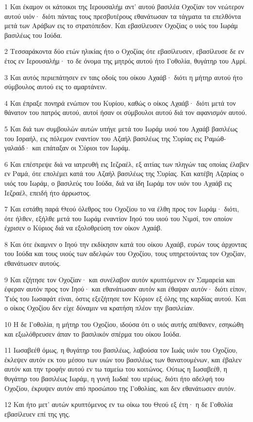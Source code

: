 \par 1 Και έκαμον οι κάτοικοι της Ιερουσαλήμ αντ' αυτού βασιλέα Οχοζίαν τον νεώτερον αυτού υιόν· διότι πάντας τους πρεσβυτέρους εθανάτωσαν τα τάγματα τα επελθόντα μετά των Αράβων εις το στρατόπεδον. Και εβασίλευσεν Οχοζίας ο υιός του Ιωράμ βασιλέως του Ιούδα.
\par 2 Τεσσαράκοντα δύο ετών ηλικίας ήτο ο Οχοζίας ότε εβασίλευσεν, εβασίλευσε δε εν έτος εν Ιερουσαλήμ· το δε όνομα της μητρός αυτού ήτο Γοθολία, θυγάτηρ του Αμρί.
\par 3 Και αυτός περιεπάτησεν εν ταις οδοίς του οίκου Αχαάβ· διότι η μήτηρ αυτού ήτο σύμβουλος αυτού εις το αμαρτάνειν.
\par 4 Και έπραξε πονηρά ενώπιον του Κυρίου, καθώς ο οίκος Αχαάβ· διότι μετά τον θάνατον του πατρός αυτού, αυτοί ήσαν οι σύμβουλοι αυτού διά τον αφανισμόν αυτού.
\par 5 Και διά των συμβουλών αυτών υπήγε μετά του Ιωράμ υιού του Αχαάβ βασιλέως του Ισραήλ, εις πόλεμον εναντίον του Αζαήλ βασιλέως της Συρίας εις Ραμώθ-γαλαάδ· και επάταξαν οι Σύριοι τον Ιωράμ.
\par 6 Και επέστρεψε διά να ιατρευθή εις Ιεζραέλ, εξ αιτίας των πληγών τας οποίας έλαβεν εν Ραμά, ότε επολέμει κατά του Αζαήλ βασιλέως της Συρίας. Και κατέβη Αζαρίας ο υιός του Ιωράμ, ο βασιλεύς του Ιούδα, διά να ίδη Ιωράμ τον υιόν του Αχαάβ εις Ιεζραέλ, επειδή ήτο άρρωστος.
\par 7 Και εστάθη παρά Θεού όλεθρος του Οχοζίου το να έλθη προς τον Ιωράμ· διότι, ότε ήλθεν, εξήλθε μετά του Ιωράμ εναντίον Ιηού του υιού του Νιμσί, τον οποίον έχρισεν ο Κύριος διά να εξολοθρεύση τον οίκον Αχαάβ.
\par 8 Και ότε έκαμνεν ο Ιηού την εκδίκησιν κατά του οίκου Αχαάβ, ευρών τους άρχοντας του Ιούδα και τους υιούς των αδελφών του Οχοζίου, τους υπηρετούντας τον Οχοζίαν, εθανάτωσεν αυτούς.
\par 9 Και εζήτησε τον Οχοζίαν· και συνέλαβον αυτόν κρυπτόμενον εν Σαμαρεία και έφεραν αυτόν προς τον Ιηού· και εθανάτωσαν αυτόν και έθαψαν αυτόν· διότι είπον, Υιός του Ιωσαφάτ είναι, όστις εξεζήτησε τον Κύριον εξ όλης της καρδίας αυτού. Και ο οίκος Οχοζίου δεν είχε δύναμιν να κρατήση πλέον την βασιλείαν.
\par 10 Η δε Γοθολία, η μήτηρ του Οχοζίου, ιδούσα ότι ο υιός αυτής απέθανεν, εσηκώθη και εξωλόθρευσεν άπαν το βασιλικόν σπέρμα του οίκου Ιούδα.
\par 11 Ιωσαβεέθ όμως, η θυγάτηρ του βασιλέως, λαβούσα τον Ιωάς υιόν του Οχοζίου, έκλεψεν αυτόν εκ του μέσου των υιών του βασιλέως των θανατουμένων, και έβαλεν αυτόν και την τροφήν αυτού εν τω ταμείω του κοιτώνος. Ούτως η Ιωσαβεέθ, η θυγάτηρ του βασιλέως Ιωράμ, η γυνή Ιωδαέ του ιερέως, διότι ήτο αδελφή του Οχοζίου, έκρυψεν αυτόν από προσώπου της Γοθολίας, και δεν εθανάτωσεν αυτόν.
\par 12 Και ήτο μετ' αυτών κρυπτόμενος εν τω οίκω του Θεού εξ έτη· η δε Γοθολία εβασίλευεν επί της γης.

